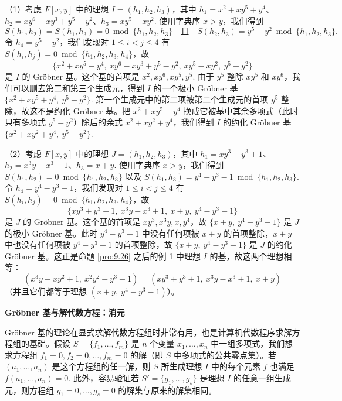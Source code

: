 \begin{example}
（1）考虑 \(F[x, y]\) 中的理想 \(I = (h_1, h_2, h_3)\)，其中 \(h_1 = x^2+xy^5+y^4\)、\(h_2 = xy^6-xy^3+y^5-y^2\)、\(h_3 = xy^5-xy^2\). 使用字典序 \(x > y\)，我们得到
\[
S(h_1, h_2) = S(h_1, h_3) = 0 \bmod \{h_1, h_2, h_3\} \quad \text{且} \quad S(h_2, h_3) = y^5-y^2 \bmod \{h_1, h_2, h_3\}.
\]
令 \(h_4 = y^5-y^2\)，我们发现对 \(1 \leq i < j \leq 4\) 有 \(S(h_i, h_j) = 0 \bmod \{h_1, h_2, h_3, h_4\}\)，故
\[
\{x^2+xy^5+y^4,\ xy^6-xy^3+y^5-y^2,\ xy^5-xy^2,\ y^5-y^2\}
\]
是 \(I\) 的 Gröbner 基。这个基的首项是 \(x^2, xy^6, xy^5, y^5\). 由于 \(y^5\) 整除 \(xy^5\) 和 \(xy^6\)，我们可以删去第二和第三个生成元，得到 \(I\) 的一个极小 Gröbner 基 \(\{x^2+xy^5+y^4,\ y^5-y^2\}\). 第一个生成元中的第二项被第二个生成元的首项 \(y^5\) 整除，故这不是约化 Gröbner 基。把 \(x^2+xy^5+y^4\) 换成它被基中其余多项式（此时只有多项式 \(y^5-y^2\)）除后的余式 \(x^2+xy^2+y^4\)，我们得到 \(I\) 的约化 Gröbner 基 \(\{x^2+xy^2+y^4,\ y^5-y^2\}\).

（2）考虑 \(F[x, y]\) 中的理想 \(J = (h_1, h_2, h_3)\)，其中 \(h_1 = xy^3+y^3+1\)、\(h_2 = x^3y-x^3+1\)、\(h_3 = x+y\). 使用字典序 \(x > y\)，我们得到 \(S(h_1, h_2) = 0 \bmod \{h_1, h_2, h_3\}\) 以及 \(S(h_1, h_3) = y^4-y^3-1 \bmod \{h_1, h_2, h_3\}\). 令 \(h_4 = y^4-y^3-1\)，我们发现对 \(1 \leq i < j \leq 4\) 有 \(S(h_i, h_j) = 0 \bmod \{h_1, h_2, h_3, h_4\}\)，故
\[
\{xy^3+y^3+1,\ x^3y-x^3+1,\ x+y,\ y^4-y^3-1\}
\]
是 \(J\) 的 Gröbner 基。这个基的首项是 \(xy^3, x^3y, x, y^4\)，故 \(\{x+y,\ y^4-y^3-1\}\) 是 \(J\) 的极小 Gröbner 基。此时 \(y^4-y^3-1\) 中没有任何项被 \(x+y\) 的首项整除，\(x+y\) 中也没有任何项被 \(y^4-y^3-1\) 的首项整除，故 \(\{x+y,\ y^4-y^3-1\}\) 是 \(J\) 的约化 Gröbner 基。这正是命题 \ref{pro:9.26} 之后的例 1 中理想 \(I\) 的基，故这两个理想相等：
\[
(x^3y-xy^2+1,\ x^2y^2-y^3-1) = (xy^3+y^3+1,\ x^3y-x^3+1,\ x+y)
\]
（并且它们都等于理想 \((x+y,\ y^4-y^3-1)\)）。
\end{example}

\noindent\textbf{Gröbner 基与解代数方程：消元}

Gröbner 基的理论在显式求解代数方程组时非常有用，也是计算机代数程序求解方程组的基础。假设 \(S = \{f_1, \ldots, f_m\}\) 是 \(n\) 个变量 \(x_1, \ldots, x_n\) 中一组多项式，我们想求方程组 \(f_1 = 0, f_2 = 0, \ldots, f_m = 0\) 的解（即 \(S\) 中多项式的公共零点集）。若 \((a_1, \ldots, a_n)\) 是这个方程组的任一解，则 \(S\) 所生成理想 \(I\) 中的每个元素 \(f\) 也满足 \(f(a_1, \ldots, a_n) = 0\). 此外，容易验证若 \(S' = \{g_1, \ldots, g_s\}\) 是理想 \(I\) 的任意一组生成元，则方程组 \(g_1 = 0, \ldots, g_s = 0\) 的解集与原来的解集相同。

